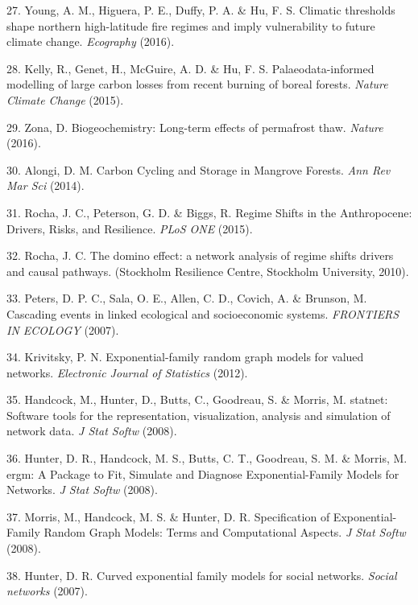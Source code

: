 \documentclass[9pt,]{article}
\begin{document}
\hypertarget{ref-Young:2016kj}{}
27. Young, A. M., Higuera, P. E., Duffy, P. A. \& Hu, F. S. Climatic
thresholds shape northern high-latitude fire regimes and imply
vulnerability to future climate change. \emph{Ecography} (2016).

\hypertarget{ref-Kelly:2015iq}{}
28. Kelly, R., Genet, H., McGuire, A. D. \& Hu, F. S.
Palaeodata-informed modelling of large carbon losses from recent burning
of boreal forests. \emph{Nature Climate Change} (2015).

\hypertarget{ref-Zona:2016hq}{}
29. Zona, D. Biogeochemistry: Long-term effects of permafrost thaw.
\emph{Nature} (2016).

\hypertarget{ref-Alongi:2014kq}{}
30. Alongi, D. M. Carbon Cycling and Storage in Mangrove Forests.
\emph{Ann Rev Mar Sci} (2014).

\hypertarget{ref-Rocha:2015du}{}
31. Rocha, J. C., Peterson, G. D. \& Biggs, R. Regime Shifts in the
Anthropocene: Drivers, Risks, and Resilience. \emph{PLoS ONE} (2015).

\hypertarget{ref-Rocha:2010vv}{}
32. Rocha, J. C. The domino effect: a network analysis of regime shifts
drivers and causal pathways. (Stockholm Resilience Centre, Stockholm
University, 2010).

\hypertarget{ref-Anonymous:2007tc}{}
33. Peters, D. P. C., Sala, O. E., Allen, C. D., Covich, A. \& Brunson,
M. Cascading events in linked ecological and socioeconomic systems.
\emph{FRONTIERS IN ECOLOGY} (2007).

\hypertarget{ref-Krivitsky:2012uo}{}
34. Krivitsky, P. N. Exponential-family random graph models for valued
networks. \emph{Electronic Journal of Statistics} (2012).

\hypertarget{ref-Handcock:2008p5095}{}
35. Handcock, M., Hunter, D., Butts, C., Goodreau, S. \& Morris, M.
statnet: Software tools for the representation, visualization, analysis
and simulation of network data. \emph{J Stat Softw} (2008).

\hypertarget{ref-Hunter:2008vh}{}
36. Hunter, D. R., Handcock, M. S., Butts, C. T., Goodreau, S. M. \&
Morris, M. ergm: A Package to Fit, Simulate and Diagnose
Exponential-Family Models for Networks. \emph{J Stat Softw} (2008).

\hypertarget{ref-Morris:2008ty}{}
37. Morris, M., Handcock, M. S. \& Hunter, D. R. Specification of
Exponential-Family Random Graph Models: Terms and Computational Aspects.
\emph{J Stat Softw} (2008).

\hypertarget{ref-Hunter:2007bq}{}
38. Hunter, D. R. Curved exponential family models for social networks.
\emph{Social networks} (2007).
\end{document}
